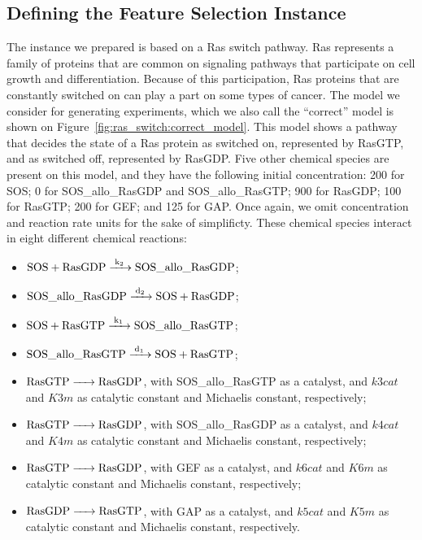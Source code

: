 \subsection{Defining the Feature Selection Instance}


% 

The instance we prepared is based on a Ras switch pathway. Ras
represents a family of proteins that are common on signaling pathways
that participate on cell growth and differentiation. Because of this
participation, Ras proteins that are constantly switched on can play a 
part on some types of cancer. The model we consider for generating 
experiments, which we also call the ``correct'' model is shown on 
Figure~\ref{fig:ras_switch:correct_model}. This model shows a pathway
that decides the state of a Ras protein as switched on, represented by
RasGTP, and as switched off, represented by RasGDP. Five other chemical
species are present on this model, and they have the following initial
concentration: 200 for SOS; 0 for SOS\_allo\_RasGDP and
SOS\_allo\_RasGTP; 900 for RasGDP; 100 for RasGTP; 200 for GEF; and 125
for GAP. Once again, we omit concentration and reaction rate units for
the sake of simplificty. These chemical species interact in eight
different chemical reactions:
\begin{itemize}
    \item{$\ce{SOS + RasGDP ->[k2] SOS\_allo\_RasGDP}$};
    \item{$\ce{SOS\_allo\_RasGDP ->[d2] SOS + RasGDP}$};
    \item{$\ce{SOS + RasGTP ->[k1] SOS\_allo\_RasGTP}$};
    \item{$\ce{SOS\_allo\_RasGTP ->[d1] SOS + RasGTP}$};
    \item{$\ce{RasGTP -> RasGDP}$}, with SOS\_allo\_RasGTP as a
        catalyst, and $k3cat$ and $K3m$ as catalytic constant and
        Michaelis constant, respectively;
    \item{$\ce{RasGTP -> RasGDP}$}, with SOS\_allo\_RasGDP as a 
        catalyst, and $k4cat$ and $K4m$ as catalytic constant and
        Michaelis constant, respectively;
    \item{$\ce{RasGTP -> RasGDP}$}, with GEF as a catalyst, and
        $k6cat$ and $K6m$ as catalytic constant and Michaelis constant,
        respectively;
    \item{$\ce{RasGDP -> RasGTP}$}, with GAP as a catalyst, and
        $k5cat$ and $K5m$ as catalytic constant and Michaelis constant,
        respectively.
\end{itemize}

